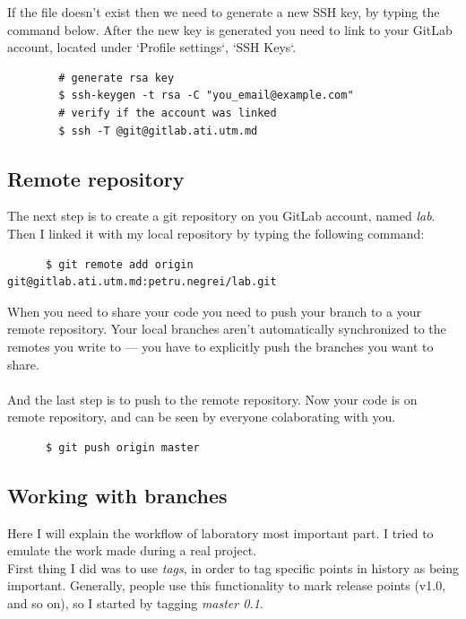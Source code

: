 \documentclass[12pt]{article}
\begin{document}
    If the file doesn't exist then we need to generate a new SSH key, by typing the
    command below. After the new key is generated you need to link to your GitLab account,
    located under `Profile settings`, `SSH Keys`.

    \begin{lstlisting}
        # generate rsa key
        $ ssh-keygen -t rsa -C "you_email@example.com"
        # verify if the account was linked
        $ ssh -T @git@gitlab.ati.utm.md
    \end{lstlisting}

    \subsection{Remote repository}

    The next step is to create a git repository on you GitLab account, named \textit{lab}. Then I linked
    it with my local repository by typing the following command: \\

    \begin{lstlisting}
      $ git remote add origin git@gitlab.ati.utm.md:petru.negrei/lab.git
    \end{lstlisting}

    When you need to share your code you need to push your branch to a your remote repository.
    Your local branches aren’t automatically synchronized to the remotes you write to — you have to explicitly push the branches you want to share. \\ \\

    And the last step is to push to the remote repository.  Now your code is on remote repository, and can be seen by everyone colaborating with you.

    \begin{lstlisting}
      $ git push origin master
    \end{lstlisting}

    \subsection{Working with branches}

    Here I will explain the workflow of laboratory most important part. I tried to emulate the work made during a real project. \\

    First thing I did was to use \textit{tags}, in order to tag specific points in history as being important.
    Generally, people use this functionality to mark release points (v1.0, and so on), so I started by tagging \textit{master 0.1}. \\
\end{document}
